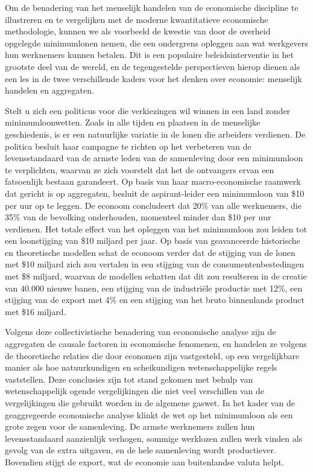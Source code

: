 Om de benadering van het menselijk handelen van de economische discipline te illustreren en te vergelijken met de moderne kwantitatieve economische methodologie, kunnen we als voorbeeld de kwestie van door de overheid opgelegde minimumlonen nemen, die een ondergrens opleggen aan wat werkgevers hun werknemers kunnen betalen. Dit is een populaire beleidsinterventie in het grootste deel van de wereld, en de tegengestelde perspectieven hierop dienen als een les in de twee verschillende kaders voor het denken over economie: menselijk handelen en aggregaten.

Stelt u zich een politicus voor die verkiezingen wil winnen in een land zonder minimumloonwetten. Zoals in alle tijden en plaatsen in de menselijke geschiedenis, is er een natuurlijke variatie in de lonen die arbeiders verdienen. De politica besluit haar campagne te richten op het verbeteren van de levensstandaard van de armste leden van de samenleving door een minimumloon te verplichten, waarvan ze zich voorstelt dat het de ontvangers ervan een fatsoenlijk bestaan garandeert. Op basis van haar macro-economische raamwerk dat gericht is op aggregaten, besluit de aspirant-leider een minimumloon van \$10 per uur op te leggen. De econoom concludeert dat 20\% van alle werknemers, die 35\% van de bevolking onderhouden, momenteel minder dan \$10 per uur verdienen. Het totale effect van het opleggen van het minimumloon zou leiden tot een loonstijging van \$10 miljard per jaar. Op basis van geavanceerde historische en theoretische modellen schat de econoom verder dat de stijging van de lonen met \$10 miljard zich zou vertalen in een stijging van de consumentenbestedingen met \$8 miljard, waarvan de modellen schatten dat dit zou resulteren in de creatie van 40.000 nieuwe banen, een stijging van de industriële productie met 12\%, een stijging van de export met 4\% en een stijging van het bruto binnenlands product met \$16 miljard.

Volgens deze collectivistische benadering van economische analyse zijn de aggregaten de causale factoren in economische fenomenen, en handelen ze volgens de theoretische relaties die door economen zijn vastgesteld, op een vergelijkbare manier als hoe natuurkundigen en scheikundigen wetenschappelijke regels vaststellen. Deze conclusies zijn tot stand gekomen met behulp van wetenschappelijk ogende vergelijkingen die niet veel verschillen van de vergelijkingen die gebruikt worden in de algemene gaswet. In het kader van de geaggregeerde economische analyse klinkt de wet op het minimumloon als een grote zegen voor de samenleving. De armste werknemers zullen hun levensstandaard aanzienlijk verhogen, sommige werklozen zullen werk vinden als gevolg van de extra uitgaven, en de hele samenleving wordt productiever. Bovendien stijgt de export, wat de economie aan buitenlandse valuta helpt.

